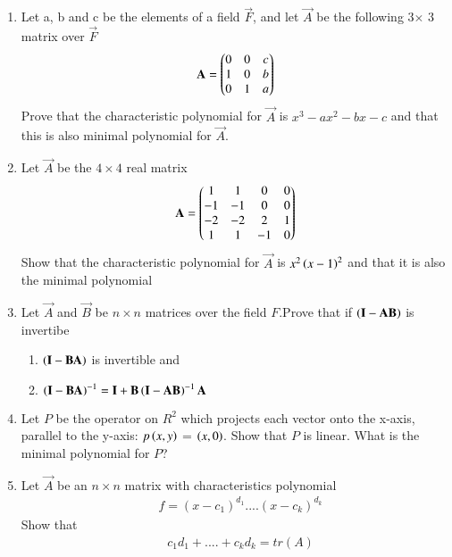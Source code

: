 \renewcommand{\theequation}{\theenumi}
\renewcommand{\thefigure}{\theenumi}
\begin{enumerate}[label=\thesubsection.\arabic*.,ref=\thesubsection.\theenumi]


\item Let a, b and c be the elements of a field $\vec{F}$, and let $\vec{A}$ be the following 3$\times$ 3 matrix over $\vec{F}$
\begin{align}
\mathbf{A} = \begin{pmatrix}0&0&c\\1&0&b\\0&1&a\end{pmatrix}
\label{eq:solutions/6/3/2/Q}
\end{align}
Prove that the characteristic polynomial for $\vec{A}$ is $x^3-ax^2-bx-c$ and that this is also minimal polynomial for $\vec{A}$.
%
\solution

\item %
Let $\Vec{A}$ be the $4\times 4$ real matrix
\begin{align}
    \Vec{A}=\myvec{1&1&0&0\\-1&-1&0&0\\-2&-2&2&1\\1&1&-1&0}
\end{align}
Show that the characteristic polynomial for $\Vec{A}$ is $x^2\left(x-1\right)^2$ and that it is also the minimal polynomial
%
\\
%
\solution

\twocolumn
\item Let $\vec{A}$ and $\vec{B}$ be $n\times n$ matrices over the 
field $F$.Prove that if $\left(\mathbf{I}-\mathbf{A}\mathbf{B}\right)$ is invertibe
\begin{enumerate}
    \item $\left(\mathbf{I}-\mathbf{B}\mathbf{A}\right)$ is invertible and
    \item $\left(\mathbf{I}-\mathbf{B}\mathbf{A}\right)^{-1}=\mathbf{I}+\mathbf{B}\left(\mathbf{I}-\mathbf{A}\mathbf{B}\right)^{-1}\mathbf{A}$
\end{enumerate}
%
\item Let $P$ be the operator on $R^2$ which projects each vector onto the x-axis, parallel to the y-axis: $p\left(x,y\right)$ = $\left(x,0\right)$. Show that $P$ is linear. What is the minimal polynomial for $P$? 
%
\\
\solution

\twocolumn
\item %
Let $\vec{A}$ be an $n\times n$ matrix with characteristics polynomial\\
\begin{align}
& f = (x-c_1)^{d_1}....(x-c_k)^{d_k} 
\end{align}
Show that
\begin{align}
& c_1d_1+....+c_kd_k = tr(A)
\end{align}
%
%
\\
\solution

\twocolumn
\end{enumerate}
